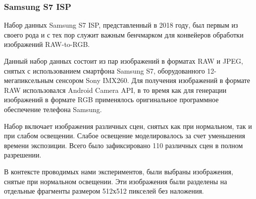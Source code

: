 \subsubsection{Samsung S7 ISP}

Набор данных Samsung S7 ISP, представленный в 2018 году, был первым из своего рода и с тех пор служит важным бенчмарком для конвейеров обработки изображений RAW-to-RGB.

Данный набор данных состоит из пар изображений в форматах RAW и JPEG, снятых с использованием смартфона Samsung S7, оборудованного 12-мегапиксельным сенсором Sony IMX260. Для получения изображений в формате RAW использовался Android Camera API, в то время как для генерации изображений в формате RGB применялось оригинальное программное обеспечение телефона Samsung.

Набор включает изображения различных сцен, снятых как при нормальном, так и при слабом освещении. Слабое освещение моделировалось за счет уменьшения времени экспозиции. Всего было зафиксировано 110 различных сцен в полном разрешении.

В контексте проводимых нами экспериментов, были выбраны изображения, снятые при нормальном освещении. Эти изображения были разделены на отдельные фрагменты размером 512х512 пикселей без наложения.